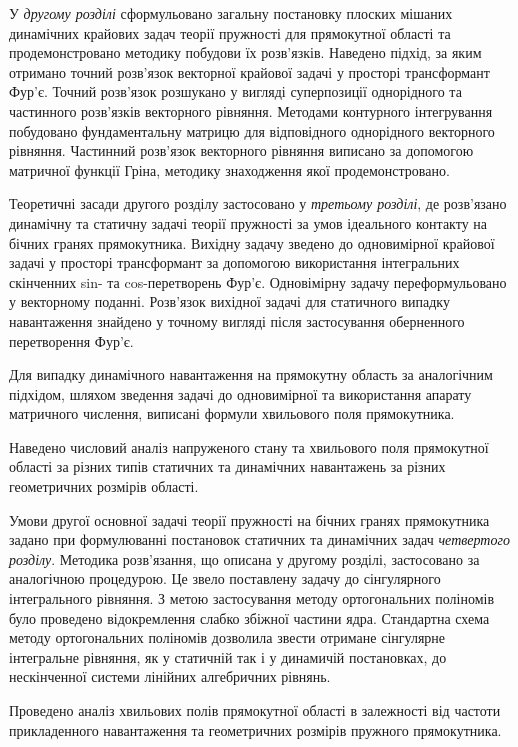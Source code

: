 У \textit{другому розділі} сформульовано загальну постановку плоских мішаних динамічних крайових задач теорії пружності для прямокутної області та
продемонстровано методику побудови їх розв'язків.
Наведено підхід, за яким отримано точний розв'язок векторної крайової задачі у просторі трансформант Фур'є.
Точний розв'язок розшукано у вигляді суперпозиції однорідного та частинного розв'язків векторного рівняння.
Методами контурного інтегрування побудовано фундаментальну матрицю для відповідного однорідного векторного рівняння.
Частинний розв'язок векторного рівняння виписано за допомогою матричної функції Гріна, методику знаходження якої продемонстровано.

Теоретичні засади другого розділу застосовано у \textit{третьому розділі}, де розв'язано динамічну та статичну задачі теорії пружності за умов ідеального контакту на бічних гранях прямокутника.
Вихідну задачу зведено до одновимірної крайової задачі у просторі трансформант за допомогою використання інтегральних скінченних sin- та cos-перетворень Фур'є.
Одновімірну задачу переформульовано у векторному поданні.
Розв'язок вихідної задачі для статичного випадку навантаження знайдено у точному вигляді після застосування оберненного перетворення Фур'є.

Для випадку динамічного навантаження на прямокутну область за аналогічним підхідом,
шляхом зведення задачі до одновимірної та використання апарату матричного числення, виписані формули хвильового поля прямокутника.

Наведено числовий аналіз напруженого стану та хвильового поля прямокутної області за різних типів статичних та динамічних навантажень за різних геометричних розмірів області.

Умови другої основної задачі теорії пружності на бічних гранях прямокутника задано при формулюванні постановок статичних та динамічних задач \textit{четвертого розділу}.
Методика розв'язання, що описана у другому розділі, застосовано за аналогічною процедурою.
Це звело поставлену задачу до сінгулярного інтегрального рівняння.
З метою застосування методу ортогональних поліномів було проведено відокремлення слабко збіжної частини ядра.
Стандартна схема методу ортогональних поліномів дозволила звести отримане сінгулярне інтегральне рівняння,
як у статичній так і у динамичій постановках, до нескінченної системи лінійних алгебричних рівнянь.

Проведено аналіз хвильових полів прямокутної області в залежності від частоти прикладенного навантаження та геометричних розмірів пружного прямокутника. 

